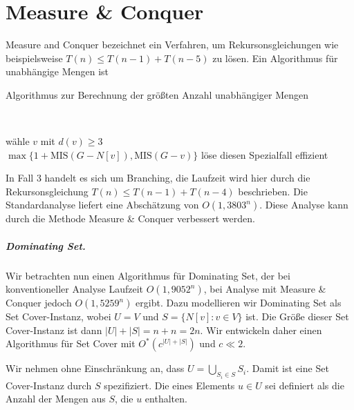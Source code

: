 \chapter{Measure \& Conquer}

  Measure and Conquer bezeichnet ein Verfahren, um Rekursonsgleichungen wie beispielsweise \(T(n) \leq T(n-1) + T(n-5)\) zu lösen. Ein Algorithmus für unabhängige Mengen ist

  \begin{algorithm}[H]
    \caption{Algorithmus zur Berechnung der größten Anzahl unabhängiger Mengen}
  
     \\

     {
      wähle \(v\) mit \(d(v) \geq 3\) \\
      \Return \(\max \{ 1 + \text{MIS}(G - N[v]), \text{MIS}(G-v) \}\) 
    } {
      löse diesen Spezialfall effizient
    }
  \end{algorithm}

  In Fall 3 handelt es sich um Branching, die Laufzeit wird hier durch die Rekursonsgleichung \(T(n) \leq T(n-1) + T(n-4)\) beschrieben. Die Standardanalyse liefert eine Abschätzung von \(O(1,3803^n)\). Diese Analyse kann durch die Methode Measure \& Conquer verbessert werden.

  \paragraph*{Dominating Set.} Wir betrachten nun einen Algorithmus für Dominating Set, der bei konventioneller Analyse Laufzeit \(O(1,9052^n)\), bei Analyse mit Measure \& Conquer jedoch \(O(1,5259^n)\) ergibt. Dazu modellieren wir Dominating Set als Set Cover-Instanz, wobei \(U = V\) und \(S = \{ N[v] : v \in V \}\) ist. Die Größe dieser Set Cover-Instanz ist dann \(|U| + |S| = n + n = 2n\). Wir entwickeln daher einen Algorithmus für Set Cover mit \(O^*(c^{|U|+|S|})\) und \(c \ll 2\).

  Wir nehmen ohne Einschränkung an, dass \(U = \bigcup_{S_i \in S} S_i\). Damit ist eine Set Cover-Instanz durch \(S\) spezifiziert. Die  eines Elements \(u \in U\) sei definiert als die Anzahl der Mengen aus \(S\), die \(u\) enthalten.

